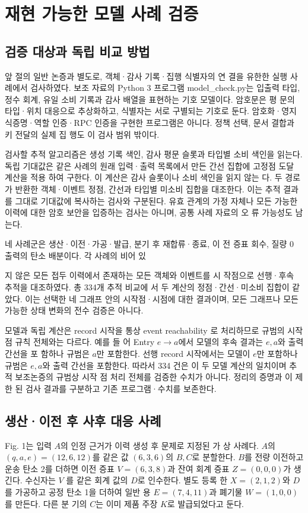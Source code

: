 \section{재현 가능한 모델 사례 검증}

\subsection{검증 대상과 독립 비교 방법}
앞 절의 일반 논증과 별도로, 객체·감사 기록·집행 식별자의 연
결을 유한한 실행 사례에서 검사하였다. 보조 자료의 Python
3 프로그램 model\_check.py는 입출력 타입, 정수 회계, 유일
소비 기록과 감사 배열을 표현하는 기호 모델이다. 암호문은 평
문의 타입·위치 대응으로 추상화하고, 식별자는 서로 구별되는
기호로 둔다. 암호화·영지식증명·역할 인증·RPC 인증을 구현한
프로그램은 아니다. 정책 선택, 문서 결합과 키 전달의 실제 집
행도 이 검사 범위 밖이다.

검사할 추적 알고리즘은 생성 기록 색인, 감사 평문 슬롯과
타입별 소비 색인을 읽는다. 독립 기대값은 같은 사례의 원래
입력·출력 목록에서 만든 간선 집합에 고정점 도달 계산을 적용
하여 구한다. 이 계산은 감사 슬롯이나 소비 색인을 읽지 않는
다. 두 경로가 반환한 객체·이벤트 정점, 간선과 타입별 미소비
집합을 대조한다. 이는 추적 결과를 그대로 기대값에 복사하는
검사와 구분된다. 유효 관계의 가정 자체나 모든 가능한 이력에
대한 암호 보안을 입증하는 검사는 아니며, 공통 사례 자료의 오
류 가능성도 남는다.

네 사례군은 생산·이전·가공·발급, 분기 후 재합류·종료, 이
전 증표 회수, 질량 0 출력의 탄소 배분이다. 각 사례의 비어 있

지 않은 모든 접두 이력에서 존재하는 모든 객체와 이벤트를 시
작점으로 선행·후속 추적을 대조하였다. 총 334개 추적 비교에
서 두 계산의 정점·간선·미소비 집합이 같았다. 이는 선택한 네
그래프 안의 시작점·시점에 대한 결과이며, 모든 그래프나 모든
가능한 상태 변화의 전수 검증은 아니다.

모델과 독립 계산은 record 시작을 통상 event reachability
로 처리하므로 규범의 시작점 규칙 전체와는 다르다. 예를 들
어 Entry \(e→a\)에서 모델의 후속 결과는 \(e,a\)와 출력 간선을 포
함하나 규범은 \(a\)만 포함한다. 선행 record 시작에서는 모델이
\(e\)만 포함하나 규범은 \(e,a\)와 출력 간선을 포함한다. 따라서 334
건은 이 두 모델 계산의 일치이며 추적 보조논증의 규범상 시작
점 처리 전체를 검증한 수치가 아니다. 정리의 증명과 이 제한
된 검사 결과를 구분하고 기존 프로그램·수치를 보존한다.

\subsection{생산·이전 후 사후 대응 사례}
Fig. 1는 입력 \(A\)의 인정 근거가 이력 생성 후 문제로 지정된 가
상 사례다. \(A\)의 \((q,a,e)=(12,6,12)\)를 같은 값 \((6,3,6)\)의
\(B,C\)로 분할한다. \(B\)를 전량 이전하고 운송 탄소 2를 더하면
이전 증표 \(V=(6,3,8)\)과 잔여 회계 증표 \(Z=(0,0,0)\)가 생
긴다. 수신자는 \(V\) 를 같은 회계 값의 \(D\)로 인수한다. 별도 등록
한 \(X=(2,1,2)\)와 \(D\)를 가공하고 공정 탄소 1을 더하여 일반
용 \(E=(7,4,11)\)과 폐기물 \(W=(1,0,0)\)를 만든다. 다른 분
기의 \(C\)는 이미 제품 주장 \(K\)로 발급되었다고 둔다.

